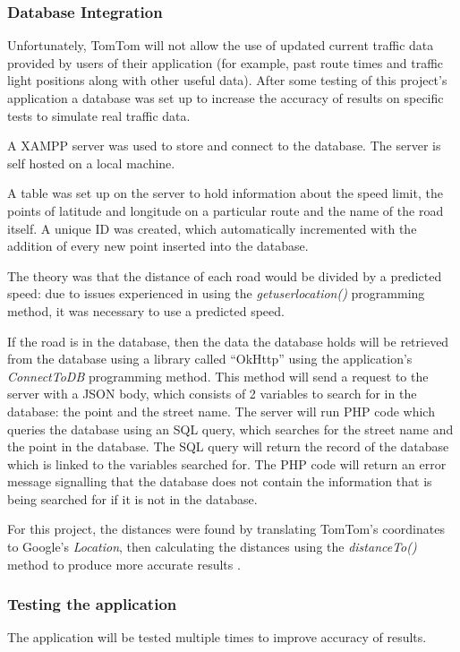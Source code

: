 \documentclass[12pt,a4paper]{article}
\begin{document}
\subsubsection{Database Integration}
Unfortunately, TomTom will not allow the use of updated current traffic data provided by users of their application (for example, past route times and traffic light positions along with other useful data). After some testing of this project's application a database was set up to increase the accuracy of results on specific tests to simulate real traffic data.

A XAMPP server was used to store and connect to the database. The server is self hosted on a local machine.

A table was set up on the server to hold information about the speed limit, the points of latitude and longitude on a particular route and the name of the road itself. A unique ID was created, which automatically incremented with the addition of every new point inserted into the database.

The theory was that the distance of each road would be divided by a predicted speed: due to issues experienced in using the \textit{getuserlocation()} programming method, it was necessary to use a predicted speed. 

If the road is in the database, then the data the database holds will be retrieved from the database using a library called \enquote{OkHttp} using the application's \textit{ConnectToDB} programming method. This method will send a request to the server with a JSON body, which consists of 2 variables to search for in the database: the point and the street name. The server will run PHP code which queries the database using an SQL query, which searches for the street name and the point in the database. The SQL query will return the record of the database which is linked to the variables searched for.  The PHP code will return an error message signalling that the database does not contain the information that is being searched for if it is not in the database.

For this project, the distances were found by translating TomTom's coordinates to Google's \textit{Location}, then calculating the distances using the \textit{distanceTo()} method to produce more accurate results \cite{GoogleLocation}.

\subsubsection{Testing the application}
The application will be tested multiple times to improve accuracy of results. 
\end{document}
